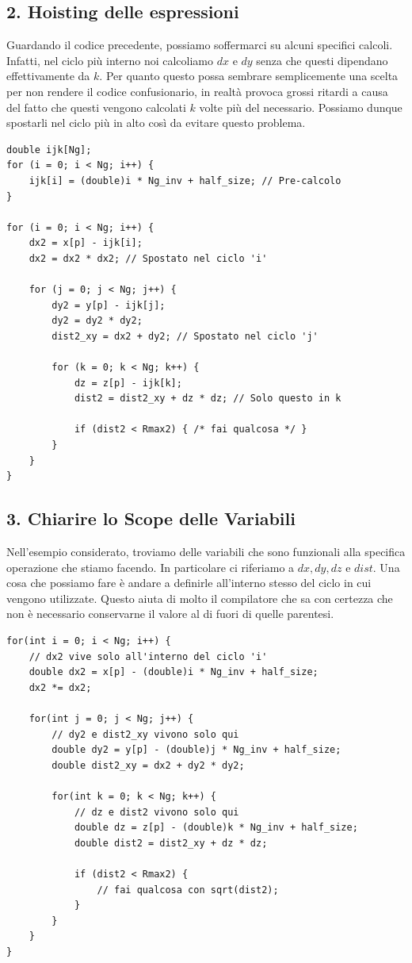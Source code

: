 \subsection{2. Hoisting delle espressioni}
Guardando il codice precedente, possiamo soffermarci su alcuni specifici calcoli. Infatti, nel ciclo più interno noi calcoliamo $dx$ e $dy$ senza che questi dipendano effettivamente da $k$. Per quanto questo possa sembrare semplicemente una scelta per non rendere il codice confusionario, in realtà provoca grossi ritardi a causa del fatto che questi vengono calcolati $k$ volte più del necessario. Possiamo dunque spostarli nel ciclo più in alto così da evitare questo problema.
\begin{framed}
\footnotesize
\begin{verbatim}
double ijk[Ng];
for (i = 0; i < Ng; i++) {
    ijk[i] = (double)i * Ng_inv + half_size; // Pre-calcolo
}

for (i = 0; i < Ng; i++) {
    dx2 = x[p] - ijk[i];
    dx2 = dx2 * dx2; // Spostato nel ciclo 'i' 
    
    for (j = 0; j < Ng; j++) {
        dy2 = y[p] - ijk[j];
        dy2 = dy2 * dy2;
        dist2_xy = dx2 + dy2; // Spostato nel ciclo 'j'
        
        for (k = 0; k < Ng; k++) {
            dz = z[p] - ijk[k];
            dist2 = dist2_xy + dz * dz; // Solo questo in k
            
            if (dist2 < Rmax2) { /* fai qualcosa */ }
        }
    }
}
\end{verbatim}
\end{framed}
\subsection{3. Chiarire lo Scope delle Variabili}
Nell'esempio considerato, troviamo delle variabili che sono funzionali alla specifica operazione che stiamo facendo. In particolare ci riferiamo a $dx,dy,dz$ e $dist$. Una cosa che possiamo fare è andare a definirle all'interno stesso del ciclo in cui vengono utilizzate. Questo aiuta di molto il compilatore che sa con certezza che non è necessario conservarne il valore al di fuori di quelle parentesi.
\begin{framed}
\footnotesize
\begin{verbatim}
for(int i = 0; i < Ng; i++) {
    // dx2 vive solo all'interno del ciclo 'i'
    double dx2 = x[p] - (double)i * Ng_inv + half_size; 
    dx2 *= dx2; 
    
    for(int j = 0; j < Ng; j++) {
        // dy2 e dist2_xy vivono solo qui
        double dy2 = y[p] - (double)j * Ng_inv + half_size; 
        double dist2_xy = dx2 + dy2 * dy2; 
        
        for(int k = 0; k < Ng; k++) {
            // dz e dist2 vivono solo qui
            double dz = z[p] - (double)k * Ng_inv + half_size; 
            double dist2 = dist2_xy + dz * dz; 
            
            if (dist2 < Rmax2) { 
                // fai qualcosa con sqrt(dist2); 
            }
        }
    }
}
\end{verbatim}
\end{framed}
